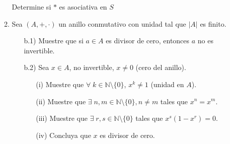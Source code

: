 \documentclass[11pt]{article}
\newcommand{\N}{\mathbb N}
\newcommand{\NN}{\N\setminus\{0\}}
\theoremstyle{plain}
\theoremstyle{definition}
\begin{document}
\begin{enumerate}
\begin{enumerate}
Determine si $\ast$ es asociativa en $S$

\item Sea $(A,+,\cdot)$ un anillo conmutativo con unidad tal que $|A|$ es finito.
\begin{enumerate}
\item[b.1)] Muestre que si $a \in A$ es divisor de cero, entonces $a$ no es invertible.
\item[b.2)] Sea $x\in A$, no invertible, $x\neq 0$ (cero del anillo).
\begin{enumerate}
\item[(i)] Muestre que $\forall \; k \in \NN$, $x^k\neq 1$ (unidad en $A$).
\item[(ii)] Muestre que $\exists \;n,m \in \NN, n\neq m$ tales que $x^n=x^m$.
\item[(iii)] Muestre que $\exists \; r,s \in \NN$ tales que $x^s(1-x^r)=0$.
\item[(iv)] Concluya que $x$ es divisor de cero.
\end{enumerate} 
\end{enumerate}
\end{enumerate}





























\end{enumerate}
\end{document}
